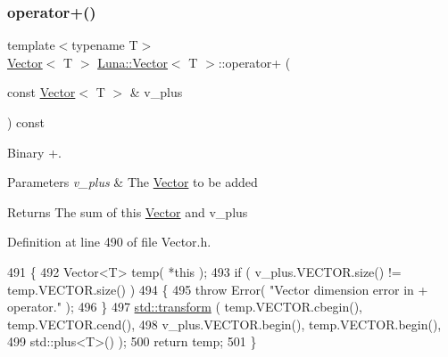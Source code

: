 \subsubsection{\texorpdfstring{operator+()}{operator+()}\hspace{0.1cm}{\footnotesize\ttfamily [2/2]}}
{\footnotesize\ttfamily template$<$typename T$>$ \\
\hyperlink{classLuna_1_1Vector}{Vector}$<$ T $>$ \hyperlink{classLuna_1_1Vector}{Luna\+::\+Vector}$<$ T $>$\+::operator+ (\begin{DoxyParamCaption}\item[{const \hyperlink{classLuna_1_1Vector}{Vector}$<$ T $>$ \&}]{v\+\_\+plus }\end{DoxyParamCaption}) const\hspace{0.3cm}{\ttfamily [inline]}}



Binary +. 


\begin{DoxyParams}{Parameters}
{\em v\+\_\+plus} & The \hyperlink{classLuna_1_1Vector}{Vector} to be added \\
\hline
\end{DoxyParams}
\begin{DoxyReturn}{Returns}
The sum of this \hyperlink{classLuna_1_1Vector}{Vector} and v\+\_\+plus 
\end{DoxyReturn}


Definition at line 490 of file Vector.\+h.


\begin{DoxyCode}
491   \{
492     Vector<T> temp( *\textcolor{keyword}{this} );
493     \textcolor{keywordflow}{if} ( v\_plus.VECTOR.size() != temp.VECTOR.size() )
494     \{
495       \textcolor{keywordflow}{throw} Error( \textcolor{stringliteral}{"Vector dimension error in + operator."} );
496     \}
497     \hyperlink{namespaceHeat__plot_aeaa6785bedcad63b4bd40e8cb1bad8a0}{std::transform} ( temp.VECTOR.cbegin(), temp.VECTOR.cend(),
498                      v\_plus.VECTOR.begin(), temp.VECTOR.begin(),
499                      std::plus<T>() );
500     \textcolor{keywordflow}{return} temp;
501   \}
\end{DoxyCode}
\mbox{\label{classLuna_1_1Vector_a80a9509a146aeab507f93f994fd7eff9}} 
